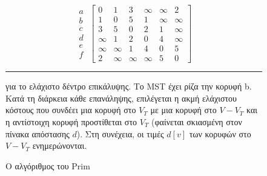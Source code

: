 \documentclass[12pt,a4paper]{article} %
\begin{document}
\begin{figure}[ht]
\begin{minipage}{0.45\textwidth}
\[
\begin{array}{c}
a \\ b \\ c \\ d \\ e \\ f
\end{array}
\;
\left[
\begin{array}{cccccc}
0 & 1 & 3 & \infty & \infty & 2 \\
1 & 0 & 5 & 1 & \infty & \infty \\
3 & 5 & 0 & 2 & 1 & \infty \\
\infty & 1 & 2 & 0 & 4 & \infty \\
\infty & \infty & 1 & 4 & 0 & 5 \\
2 & \infty & \infty & \infty & 5 & 0
\end{array}
\right]
\]
\vspace{1cm}
\end{minipage}

\vspace{0.3cm}
\noindent\rule{\textwidth}{0.2pt}

\caption{Ο αλγόριθμος του Prim} για το ελάχιστο δέντρο επικάλυψης. Το MST έχει ρίζα την κορυφή b. Κατά τη διάρκεια κάθε επανάληψης, επιλέγεται η ακμή ελάχιστου κόστους που συνδέει μια κορυφή στο $V_T$ με μια κορυφή στο $V-V_T$ και η αντίστοιχη κορυφή προστίθεται στο $V_T$ (φαίνεται σκιασμένη στον πίνακα απόστασης $d$). Στη συνέχεια, οι τιμές $d[v]$ των κορυφών στο $V-V_T$ ενημερώνονται.
\label{fig:graph5}
\end{figure}
\vspace{0.5cm}
\end{document}
